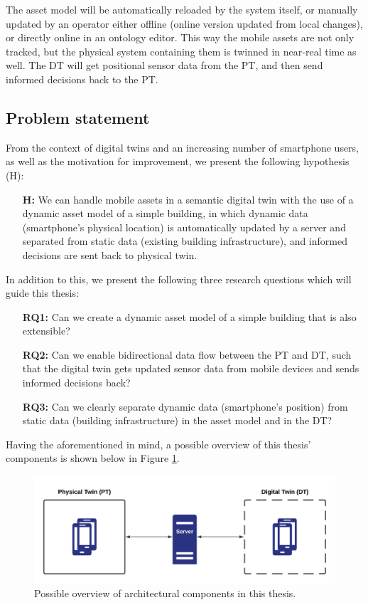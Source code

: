 \documentclass{article}
\begin{document}
The asset model will be automatically reloaded by the system itself, or manually updated by an operator either offline (online version updated from local changes), or directly online in an ontology editor. This way the mobile assets are not only tracked, but the physical system containing them is twinned in near-real time as well. The DT will get positional sensor data from the PT, and then send informed decisions back to the PT.

\subsection{Problem statement}
From the context of digital twins and an increasing number of smartphone users, as well as the motivation for improvement, we present the following hypothesis (H):

\begin{itemize}
    \item[\textbf{H:}] We can handle mobile assets in a semantic digital twin with the use of a dynamic asset model of a simple building, in which dynamic data (smartphone's physical location) is automatically updated by a server and separated from static data (existing building infrastructure), and informed decisions are sent back to physical twin.
\end{itemize}


In addition to this, we present the following three research questions which will guide this thesis:
\begin{itemize}
    \item[\textbf{RQ1:}]
    Can we create a dynamic asset model of a simple building that is also extensible?
    \item [\textbf{RQ2:}] 
    Can we enable bidirectional data flow between the PT and DT, such that the digital twin gets updated sensor data from mobile devices and sends informed decisions back?
    \item [\textbf{RQ3:}]
    Can we clearly separate dynamic data (smartphone's position) from static data (building infrastructure) in the asset model and in the DT?
\end{itemize}

Having the aforementioned in mind, a possible overview of this thesis' components is shown below in Figure \ref{fig:initial_components}.

\begin{figure}[H]
    \centering
    \includegraphics[scale=0.14]{graphics/initial_thesis_overview.png}
    \caption{Possible overview of architectural components in this thesis.}
    \label{fig:initial_components}
\end{figure}
\end{document}
